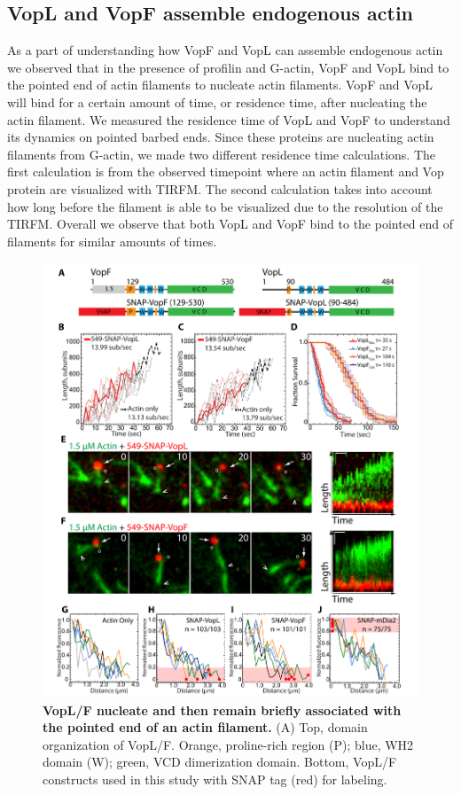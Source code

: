 \subsection{VopL and VopF assemble endogenous actin}\label{vops}

As a part of understanding how VopF and VopL can assemble endogenous actin we observed that in the presence of profilin and G-actin, VopF and VopL bind to the pointed end of actin filaments to nucleate actin filaments. VopF and VopL will bind for a certain amount of time, or residence time, after nucleating the actin filament. We measured the residence time of VopL and VopF to understand its dynamics on pointed barbed ends. Since these proteins are nucleating actin filaments from G-actin, we made two different residence time calculations. The first calculation is from the observed timepoint where an actin filament and Vop protein are visualized with TIRFM. The second calculation takes into account how long before the filament is able to be visualized due to the resolution of the TIRFM. Overall we observe that both VopL and VopF bind to the pointed end of filaments for similar amounts of times. 

\begin{figure}
\centering
\includegraphics[width=\textwidth]{img/ch04/Thesis_Vop.pdf}
\caption[ VopL/F nucleate and then remain briefly associated with the pointed end of an actin filament.]{\textbf{ VopL/F nucleate and then remain briefly associated with the pointed end of an actin filament.} (A) Top, domain organization of VopL/F. Orange, proline-rich region (P); blue, WH2 domain (W); green, VCD dimerization domain. Bottom, VopL/F constructs used in this study with SNAP tag (red) for labeling. }
\label{fig:vop}
\end{figure}

